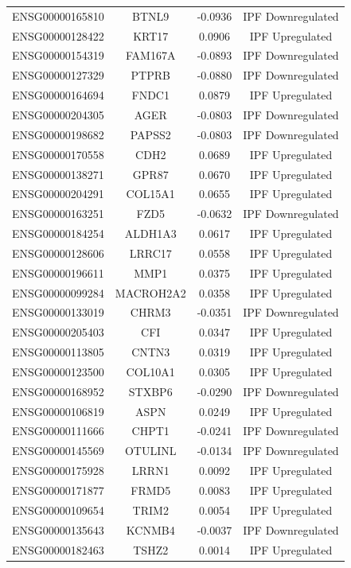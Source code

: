 \documentclass[
]{article}
\begin{document}
\begin{singlespace}
\begin{longtable}[t]{lccc}
ENSG00000165810 & BTNL9 & -0.0936 & IPF Downregulated\\
ENSG00000128422 & KRT17 & 0.0906 & IPF Upregulated\\
ENSG00000154319 & FAM167A & -0.0893 & IPF Downregulated\\
\addlinespace
ENSG00000127329 & PTPRB & -0.0880 & IPF Downregulated\\
ENSG00000164694 & FNDC1 & 0.0879 & IPF Upregulated\\
ENSG00000204305 & AGER & -0.0803 & IPF Downregulated\\
ENSG00000198682 & PAPSS2 & -0.0803 & IPF Downregulated\\
ENSG00000170558 & CDH2 & 0.0689 & IPF Upregulated\\
\addlinespace
ENSG00000138271 & GPR87 & 0.0670 & IPF Upregulated\\
ENSG00000204291 & COL15A1 & 0.0655 & IPF Upregulated\\
ENSG00000163251 & FZD5 & -0.0632 & IPF Downregulated\\
ENSG00000184254 & ALDH1A3 & 0.0617 & IPF Upregulated\\
ENSG00000128606 & LRRC17 & 0.0558 & IPF Upregulated\\
\addlinespace
ENSG00000196611 & MMP1 & 0.0375 & IPF Upregulated\\
ENSG00000099284 & MACROH2A2 & 0.0358 & IPF Upregulated\\
ENSG00000133019 & CHRM3 & -0.0351 & IPF Downregulated\\
ENSG00000205403 & CFI & 0.0347 & IPF Upregulated\\
ENSG00000113805 & CNTN3 & 0.0319 & IPF Upregulated\\
\addlinespace
ENSG00000123500 & COL10A1 & 0.0305 & IPF Upregulated\\
ENSG00000168952 & STXBP6 & -0.0290 & IPF Downregulated\\
ENSG00000106819 & ASPN & 0.0249 & IPF Upregulated\\
ENSG00000111666 & CHPT1 & -0.0241 & IPF Downregulated\\
ENSG00000145569 & OTULINL & -0.0134 & IPF Downregulated\\
\addlinespace
ENSG00000175928 & LRRN1 & 0.0092 & IPF Upregulated\\
ENSG00000171877 & FRMD5 & 0.0083 & IPF Upregulated\\
ENSG00000109654 & TRIM2 & 0.0054 & IPF Upregulated\\
ENSG00000135643 & KCNMB4 & -0.0037 & IPF Downregulated\\
ENSG00000182463 & TSHZ2 & 0.0014 & IPF Upregulated\\*
\end{longtable}
\endgroup{}




\end{singlespace}
\end{document}

